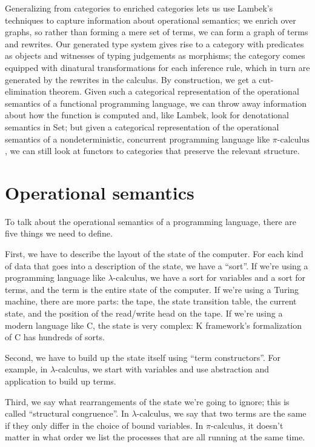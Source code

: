 \documentclass[submission,copyright,creativecommons]{eptcs}
\newcommand{\pic}{$\pi\mbox{-calculus}$\xspace}
\newcommand{\lac}{$\lambda\mbox{-calculus}$\xspace}
\begin{document}
Generalizing from categories to enriched categories lets us use Lambek's techniques to capture information about operational semantics; we enrich over graphs, so rather than forming a mere set of terms, we can form a graph of terms and rewrites.  Our generated type system gives rise to a category with predicates as objects and witnesses of typing judgements as morphisms; the category comes equipped with dinatural transformations for each inference rule, which in turn are generated by the rewrites in the calculus.  By construction, we get a cut-elimination theorem.  Given such a categorical representation of the operational semantics of a functional programming language, we can throw away information about how the function is computed and, like Lambek, look for denotational semantics in Set; but given a categorical representation of the operational semantics of a nondeterministic, concurrent programming language like \pic, we can still look at functors to categories that preserve the relevant structure.

\section {Operational semantics}

To talk about the operational semantics of a programming language, there are five things we need to define.

First, we have to describe the layout of the state of the computer. For each kind of data that goes into a description of the state, we have a ``sort''.  If we're using a programming language like \lac, we have a sort for variables and a sort for terms, and the term is the entire state of the computer.  If we're using a Turing machine, there are more parts: the tape, the state transition table, the current state, and the position of the read/write head on the tape.  If we're using a modern language like C, the state is very complex: K framework's formalization of C has hundreds of sorts.

Second, we have to build up the state itself using ``term constructors''.  For example, in \lac, we start with variables and use abstraction and application to build up terms.

Third, we say what rearrangements of the state we're going to ignore; this is called ``structural congruence''.  In \lac, we say that two terms are the same if they only differ in the choice of bound variables.  In \pic, it doesn't matter in what order we list the processes that are all running at the same time.
\end{document}
